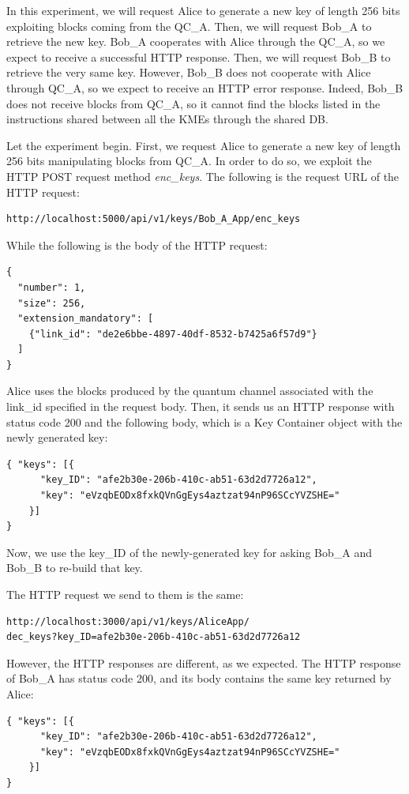 In this experiment, we will request Alice to generate a new key of length 256 bits exploiting blocks coming from the QC\_A. Then, we will request Bob\_A to retrieve the new key. Bob\_A cooperates with Alice through the QC\_A, so we expect to receive a successful HTTP response. Then, we will request Bob\_B to retrieve the very same key. However, Bob\_B does not cooperate with Alice through QC\_A, so we expect to receive an HTTP error response. Indeed, Bob\_B does not receive blocks from QC\_A, so it cannot find the blocks listed in the instructions shared between all the KMEs through the shared DB.

Let the experiment begin.
First, we request Alice to generate a new key of length 256 bits manipulating blocks from QC\_A. In order to do so, we exploit the HTTP POST request method \textit{enc\_keys}. The following is the request URL of the HTTP request:

\begin{verbatim}
http://localhost:5000/api/v1/keys/Bob_A_App/enc_keys
\end{verbatim}

While the following is the body of the HTTP request:
\begin{verbatim}
{
  "number": 1,
  "size": 256,
  "extension_mandatory": [
    {"link_id": "de2e6bbe-4897-40df-8532-b7425a6f57d9"}
  ]
}
\end{verbatim}

Alice uses the blocks produced by the quantum channel associated with the link\_id specified in the request body. Then, it sends us an HTTP response with status code 200 and the following body, which is a Key Container object with the newly generated key:
\begin{verbatim}
{ "keys": [{
      "key_ID": "afe2b30e-206b-410c-ab51-63d2d7726a12",
      "key": "eVzqbEODx8fxkQVnGgEys4aztzat94nP96SCcYVZSHE="
    }]
}
\end{verbatim}

Now, we use the key\_ID of the newly-generated key for asking Bob\_A and Bob\_B to re-build that key.

The HTTP request we send to them is the same:

\begin{verbatim}
http://localhost:3000/api/v1/keys/AliceApp/
dec_keys?key_ID=afe2b30e-206b-410c-ab51-63d2d7726a12
\end{verbatim}

However, the HTTP responses are different, as we expected. The HTTP response of Bob\_A has status code 200, and its body contains the same key returned by Alice:
\begin{verbatim}
{ "keys": [{
      "key_ID": "afe2b30e-206b-410c-ab51-63d2d7726a12",
      "key": "eVzqbEODx8fxkQVnGgEys4aztzat94nP96SCcYVZSHE="
    }]
}
\end{verbatim}

